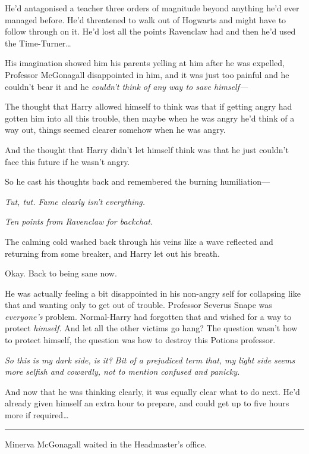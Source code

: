 He'd antagonised a teacher three orders of magnitude beyond anything
he'd ever managed before. He'd threatened to walk out of Hogwarts and
might have to follow through on it. He'd lost all the points Ravenclaw
had and then he'd used the Time-Turner\ldots{}

His imagination showed him his parents yelling at him after he was
expelled, Professor McGonagall disappointed in him, and it was just too
painful and he couldn't bear it and he \emph{couldn't think of any way
to save himself---}

The thought that Harry allowed himself to think was that if getting
angry had gotten him into all this trouble, then maybe when he was angry
he'd think of a way out, things seemed clearer somehow when he was
angry.

And the thought that Harry didn't let himself think was that he just
couldn't face this future if he wasn't angry.

So he cast his thoughts back and remembered the burning humiliation---

\emph{Tut, tut. Fame clearly isn't everything.}

\emph{Ten points from Ravenclaw for backchat.}

The calming cold washed back through his veins like a wave reflected and
returning from some breaker, and Harry let out his breath.

Okay. Back to being sane now.

He was actually feeling a bit disappointed in his non-angry self for
collapsing like that and wanting only to get out of trouble. Professor
Severus Snape was \emph{everyone's} problem. Normal-Harry had forgotten
that and wished for a way to protect \emph{himself.} And let all the
other victims go hang? The question wasn't how to protect himself, the
question was how to destroy this Potions professor.

\emph{So this is my dark side, is it?} \emph{Bit of a prejudiced term
that, my light side seems more selfish and cowardly, not to mention
confused and panicky.}

And now that he was thinking clearly, it was equally clear what to do
next. He'd already given himself an extra hour to prepare, and could get
up to five hours more if required\ldots{}

\begin{center}\rule{3in}{0.4pt}\end{center}

Minerva McGonagall waited in the Headmaster's office.

